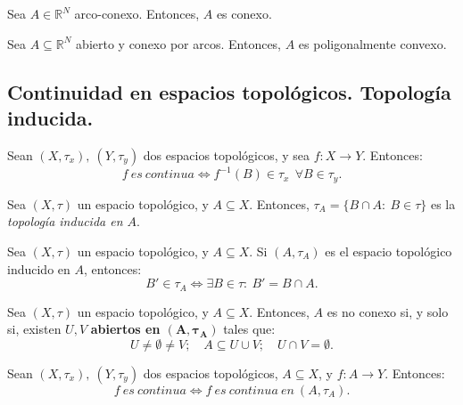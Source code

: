 \begin{nprop}
Sea $A\in \mathbb{R}^N$ arco-conexo. Entonces, $A$ es conexo.
\end{nprop}



\begin{nprop}
Sea $A\subseteq \mathbb{R}^N$ abierto y conexo por arcos. Entonces, $A$ es poligonalmente convexo.
\end{nprop}


\subsection{Continuidad en espacios topológicos. Topología inducida.}

\begin{ndef}
Sean $(X,\tau_x),\ (Y,\tau_y)$ dos espacios topológicos, y sea $f:X\longrightarrow Y$. Entonces: $$f\ es\ continua \iff f^{-1}(B) \in \tau_x \ \ \forall B \in \tau_y.$$
\end{ndef}



\begin{ndef}
Sea $(X,\tau)$ un espacio topológico, y $A\subseteq X$. Entonces, $\tau_A = \{B\cap A: \ B \in \tau\}$ es la \textit{topología inducida en $A$}.
\end{ndef}



\begin{nprop}
Sea $(X,\tau)$ un espacio topológico, y $A\subseteq X$. Si $(A,\tau_A)$ es el espacio topológico inducido en $A$, entonces: $$B' \in \tau_A \iff \exists B\in \tau: \ B' = B\cap A.$$
\end{nprop}



\begin{nprop}
Sea $(X,\tau)$ un espacio topológico, y $A\subseteq X$. Entonces, $A$ es no conexo si, y solo si, existen $U,V$ \textbf{abiertos en $\bm{(A,\tau_A)}$} tales que: $$U \ne \emptyset \ne V;\quad A \subseteq U \cup V;\quad U \cap V = \emptyset.$$
\end{nprop}



\begin{ndef}
Sean $(X,\tau_x),\ (Y,\tau_y)$ dos espacios topológicos, $A\subseteq X$, y $f:A\longrightarrow Y$. Entonces: $$f\ es\ continua \iff f\ es\ continua\ en\ (A,\tau_A).$$
\end{ndef}



